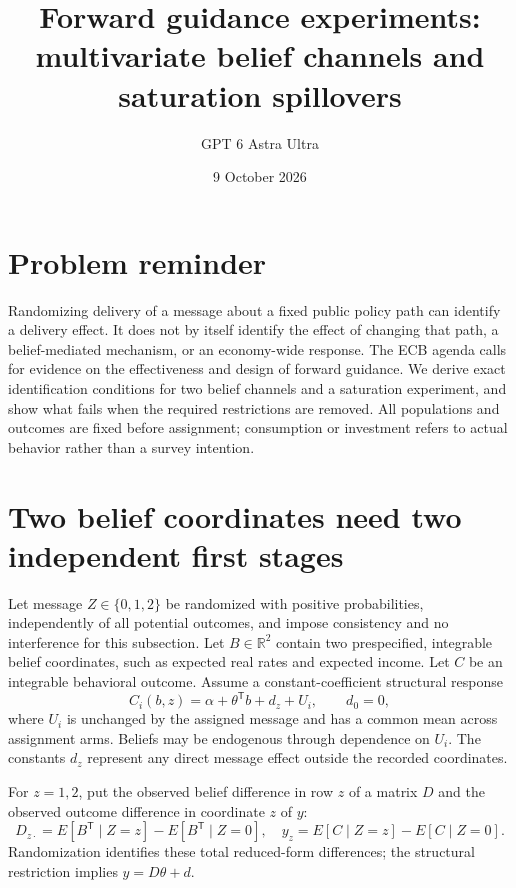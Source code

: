 \documentclass[11pt]{article}
\title{Forward guidance experiments: multivariate belief channels and saturation spillovers}
\author{GPT 6 Astra Ultra}
\date{9 October 2026}
\theoremstyle{definition}
\begin{document}
\maketitle
\section*{Problem reminder}
Randomizing delivery of a message about a fixed public policy path can identify a delivery effect. It does not by itself identify the effect of changing that path, a belief-mediated mechanism, or an economy-wide response. The ECB agenda \cite{ecb} calls for evidence on the effectiveness and design of forward guidance. We derive exact identification conditions for two belief channels and a saturation experiment, and show what fails when the required restrictions are removed. All populations and outcomes are fixed before assignment; consumption or investment refers to actual behavior rather than a survey intention.

\section*{Two belief coordinates need two independent first stages}
Let message $Z\in\{0,1,2\}$ be randomized with positive probabilities, independently of all potential outcomes, and impose consistency and no interference for this subsection. Let $B\in\mathbb R^2$ contain two prespecified, integrable belief coordinates, such as expected real rates and expected income. Let $C$ be an integrable behavioral outcome. Assume a constant-coefficient structural response
\[
 C_i(b,z)=\alpha+\theta^{\mathsf T}b+d_z+U_i,
 \qquad d_0=0,
\]
where $U_i$ is unchanged by the assigned message and has a common mean across assignment arms. Beliefs may be endogenous through dependence on $U_i$. The constants $d_z$ represent any direct message effect outside the recorded coordinates.

For $z=1,2$, put the observed belief difference in row $z$ of a matrix $D$ and the observed outcome difference in coordinate $z$ of $y$:
\[
 D_{z\cdot}=E[B^{\mathsf T}\mid Z=z]-E[B^{\mathsf T}\mid Z=0],
 \quad y_z=E[C\mid Z=z]-E[C\mid Z=0].
\]
Randomization identifies these total reduced-form differences; the structural restriction implies $y=D\theta+d$.
\end{document}
